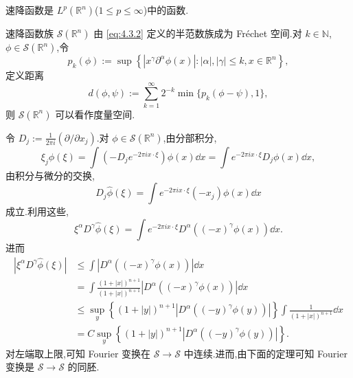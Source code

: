 速降函数是 $L^{p}(\mathbb{R}^{n})$($1 \leq p \leq \infty$)中的函数.

速降函数族 $\mathcal{S}(\mathbb{R}^{n})$ 由 \eqref{eq:4.3.2} 定义的半范数族成为 Fréchet 空间.对 $k \in \mathbb{N}$,$\phi \in \mathcal{S}(\mathbb{R}^{n})$,令
\begin{equation*}
p_{k}(\phi) := \sup\left\{\left|x^{\gamma}\partial^{\alpha}\phi(x)\right|: |\alpha|, |\gamma| \leq k, x \in \mathbb{R}^{n}\right\},
\end{equation*}
定义距离
\begin{equation*}
d(\phi, \psi) := \sum_{k=1}^{\infty}2^{-k}\min\{p_{k}(\phi - \psi), 1\},
\end{equation*}
则 $\mathcal{S}(\mathbb{R}^{n})$ 可以看作度量空间.

令 $D_{j} := \frac{1}{2\pi i}(\partial/\partial x_{j})$.对 $\phi \in \mathcal{S}(\mathbb{R}^{n})$,由分部积分,
\begin{equation*}
\xi_{j}\hat{\phi}(\xi) = \int\left(-D_{j}e^{-2\pi i x\cdot\xi}\right)\phi(x)\dd x = \int e^{-2\pi i x\cdot\xi}D_{j}\phi(x)\dd x,
\end{equation*}
由积分与微分的交换,
\begin{equation*}
D_{j}\hat{\phi}(\xi) = \int e^{-2\pi i x\cdot\xi}(-x_{j})\phi(x)\dd x
\end{equation*}
成立.利用这些,
\begin{equation*}
\xi^{\alpha}D^{\gamma}\hat{\phi}(\xi) = \int e^{-2\pi i x\cdot\xi}D^{\alpha}\left((-x)^{\gamma}\phi(x)\right)\dd x.
\end{equation*}
进而
\begin{equation}
\begin{aligned}
|\xi^{\alpha}D^{\gamma}\hat{\phi}(\xi)| & \leq \int\left|D^{\alpha}\left((-x)^{\gamma}\phi(x)\right)\right|\dd x \\
& = \int\frac{(1 + |x|)^{n+1}}{(1 + |x|)^{n+1}}\left|D^{\alpha}\left((-x)^{\gamma}\phi(x)\right)\right|\dd x \\
& \leq \sup_{y}\left\{(1 + |y|)^{n+1}\left|D^{\alpha}\left((-y)^{\gamma}\phi(y)\right)\right|\right\}\int\frac{1}{(1 + |x|)^{n+1}}\dd x \\
& = C\sup_{y}\left\{(1 + |y|)^{n+1}\left|D^{\alpha}\left((-y)^{\gamma}\phi(y)\right)\right|\right\}.
\end{aligned}
\end{equation}
对左端取上限,可知 Fourier 变换在 $\mathcal{S} \to \mathcal{S}$ 中连续.进而,由下面的定理可知 Fourier 变换是 $\mathcal{S} \to \mathcal{S}$ 的同胚.

